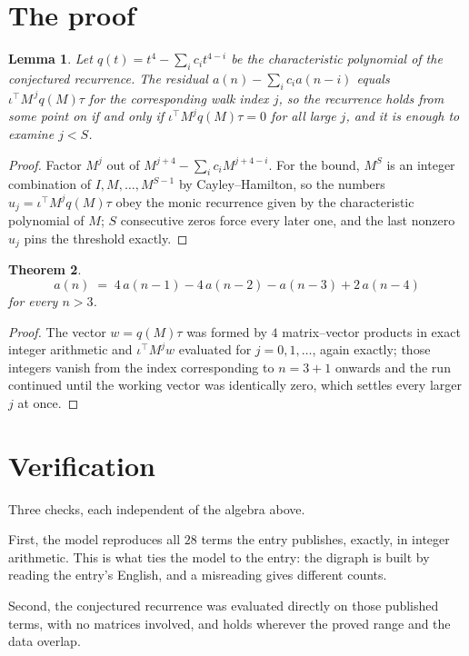 \documentclass[11pt,a4paper]{article}
\theoremstyle{plain}
\newtheorem{theorem}{Theorem}
\newtheorem{lemma}[theorem]{Lemma}
\theoremstyle{definition}
\begin{document}
\section{The proof}

\begin{lemma}\label{lem:crit}
Let $q(t)=t^{4}-\sum_i c_it^{4-i}$ be the characteristic polynomial of the
conjectured recurrence. The residual $a(n)-\sum_ic_ia(n-i)$ equals
$\iota^{\!\top}M^{\,j}q(M)\tau$ for the corresponding walk index $j$, so the recurrence
holds from some point on if and only if $\iota^{\!\top}M^{j}q(M)\tau=0$ for all large $j$,
and it is enough to examine $j<S$.
\end{lemma}

\begin{proof}
Factor $M^{j}$ out of $M^{j+4}-\sum_ic_iM^{j+4-i}$. For the bound, $M^{S}$
is an integer combination of $I,M,\dots,M^{S-1}$ by Cayley--Hamilton, so the numbers
$u_j=\iota^{\!\top}M^{j}q(M)\tau$ obey the monic recurrence given by the characteristic
polynomial of $M$; $S$ consecutive zeros force every later one, and the last nonzero $u_j$
pins the threshold exactly.
\end{proof}

\begin{theorem}
\[
a(n)\;=\;4\,a(n-1) - 4\,a(n-2) - a(n-3) + 2\,a(n-4)
\]
for every $n>3$.
\end{theorem}

\begin{proof}
The vector $w=q(M)\tau$ was formed by $4$ matrix--vector products in exact integer
arithmetic and $\iota^{\!\top}M^{j}w$ evaluated for $j=0,1,\dots$, again exactly; those
integers vanish from the index corresponding to $n=3+1$ onwards and the run continued
until the working vector was identically zero, which settles every larger $j$ at once.
\end{proof}

\section{Verification}

Three checks, each independent of the algebra above.

First, the model reproduces all $28$ terms the entry publishes, exactly, in integer
arithmetic. This is what ties the model to the entry: the digraph is built by reading the
entry's English, and a misreading gives different counts.

Second, the conjectured recurrence was evaluated directly on those published terms, with no
matrices involved, and holds wherever the proved range and the data overlap.
\end{document}
